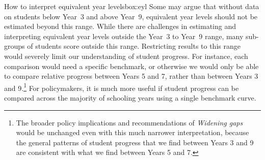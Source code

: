 \begin{bigparbox*}{How to interpret equivalent year levels}{box:eyl}
Some may argue that without data on students below \mbox{Year 3} and above \mbox{Year 9}, equivalent year levels should not be estimated beyond this range. While there are challenges in estimating and interpreting equivalent year levels outside the \mbox{Year 3} to \mbox{Year 9} range, many sub-groups of students score outside this range. Restricting results to this range would severely limit our understanding of student progress. For instance, each comparison would need a specific benchmark, or otherwise we would only be able to compare relative progress between Years 5 and 7, rather than between Years 3 and 9.\footnote{The broader policy implications and recommendations of \textit{Widening gaps} would be unchanged even with this much narrower interpretation, because the general patterns of student progress that we find between Years 3 and 9 are consistent with what we find between Years 5 and 7.} For policymakers, it is much more useful if student progress can be compared across the majority of schooling years using a single benchmark curve.

\end{bigparbox*}
